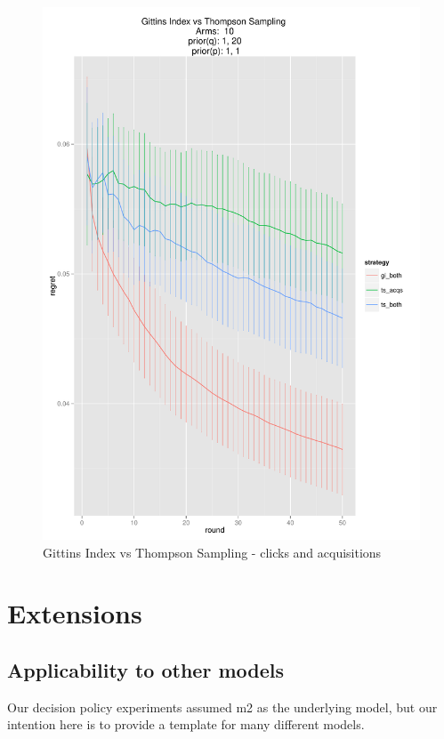 \documentclass[11pt,a4,singlespacing,titlepagenumber=on]{scrreprt}
\numberwithin{equation}{chapter} %
\theoremstyle{remark}
\begin{document}
\begin{figure}[p]
    \centering
    \includegraphics[scale=0.7]{GIBoth.pdf}
    \caption{ Gittins Index vs Thompson Sampling - clicks and acquisitions }
\end{figure}




\chapter{Extensions}

\section{Applicability to other models}

Our decision policy experiments assumed m2 as the underlying model, but our intention here is to provide a template for many different models. 
\end{document}
